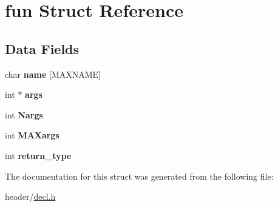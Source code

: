 \hypertarget{structfun}{}\section{fun Struct Reference}
\label{structfun}
\subsection*{Data Fields}
\begin{DoxyCompactItemize}
\item 
\mbox{\label{structfun_afdd40a771835cf5f3511c7ac6fb6e664}} 
char {\bfseries name} \mbox{[}M\+A\+X\+N\+A\+ME\mbox{]}
\item 
\mbox{\label{structfun_a898b215286a6574d95803a8ba019a0ea}} 
int $\ast$ {\bfseries args}
\item 
\mbox{\label{structfun_a7239f4accd8e685ac9d88cb0f1eca6be}} 
int {\bfseries Nargs}
\item 
\mbox{\label{structfun_a234ea53da5de088dfacb77b9f7a3e7d3}} 
int {\bfseries M\+A\+Xargs}
\item 
\mbox{\label{structfun_a3a30fedbb952e6b50ccb4f70a75cef05}} 
int {\bfseries return\+\_\+type}
\end{DoxyCompactItemize}


The documentation for this struct was generated from the following file\+:\begin{DoxyCompactItemize}
\item 
header/\hyperlink{decl_8h}{decl.\+h}\end{DoxyCompactItemize}
